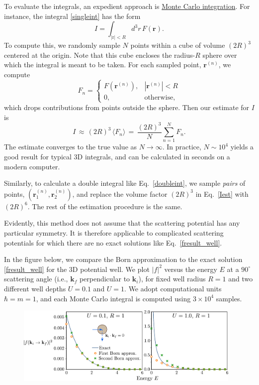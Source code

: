 \documentclass[pra,12pt]{revtex4-2}
\begin{document}
To evaluate the integrals, an expedient approach is
\href{https://en.wikipedia.org/wiki/Monte_Carlo_integration}{Monte
  Carlo integration}.  For instance, the integral \eqref{singleint}
has the form
\begin{equation}
  I = \int_{|\mathrm{r}|<R} d^3r \, F(\mathbf{r}).
\end{equation}
To compute this, we randomly sample $N$ points within a cube of volume
$(2R)^3$ centered at the origin.  Note that this cube encloses the
radius-$R$ sphere over which the integral is meant to be taken.  For
each sampled point, $\mathbf{r}^{(n)}$, we compute
\begin{equation}
  F_n = \begin{cases}F(\mathbf{r}^{(n)}), & |\mathbf{r}^{(n)}| < R \\ 0, &\mathrm{otherwise},\end{cases}
\end{equation}
which drops contributions from points outside the sphere.  Then our
estimate for $I$ is
\begin{equation}
  I \,\approx\, (2R)^3 \, \langle F_n\rangle \,=\, \frac{(2R)^3}{N} \sum_{n=1}^N F_n.
  \label{Iest}
\end{equation}
The estimate converges to the true value as $N\rightarrow\infty$.  In
practice, $N \sim 10^4$ yields a good result for typical 3D integrals,
and can be calculated in seconds on a modern computer.

Similarly, to calculate a double integral like Eq.~\eqref{doubleint},
we sample \textit{pairs} of points, $(\mathbf{r}_1^{(n)},
\mathbf{r}_2^{(n)})$, and replace the volume factor $(2R)^3$ in
Eq.~\eqref{Iest} with $(2R)^6$.  The rest of the estimation procedure
is the same.

Evidently, this method does not assume that the scattering potential
has any particular symmetry.  It is therefore applicable to
complicated scattering potentials for which there are no exact
solutions like Eq.~\eqref{fresult_well}.

In the figure below, we compare the Born approximation to the exact
solution \eqref{fresult_well} for the 3D potential well.  We plot
$|f|^2$ versus the energy $E$ at a $90^\circ$ scattering angle (i.e.,
$\mathbf{k}_f$ perpendicular to $\mathbf{k}_i$), for fixed well radius
$R = 1$ and two different well depths $U = 0.1$ and $U = 1$.  We adopt
computational units $\hbar = m = 1$, and each Monte Carlo integral is
computed using $3\times10^4$ samples.

\begin{figure}[h]
  \centering\includegraphics[width=0.97\textwidth]{spherical_well_scattering}
\end{figure}
\end{document}
